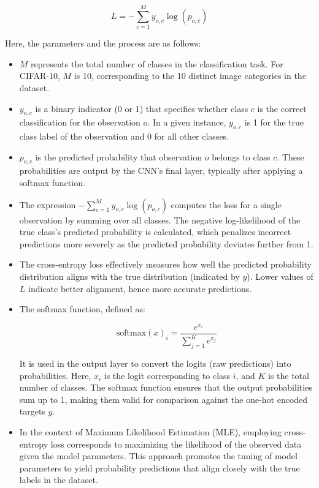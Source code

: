 \documentclass[conference]{IEEEtran}
\begin{document}
	\begin{equation}
		L = - \sum_{c=1}^{M} y_{o,c} \log(p_{o,c})
	\end{equation}
	
	Here, the parameters and the process are as follows:
	\begin{itemize}
		\item \(M\) represents the total number of classes in the classification task. For CIFAR-10, \(M\) is 10, corresponding to the 10 distinct image categories in the dataset.
		
		\item \(y_{o,c}\) is a binary indicator (0 or 1) that specifies whether class \(c\) is the correct classification for the observation \(o\). In a given instance, \(y_{o,c}\) is 1 for the true class label of the observation and 0 for all other classes.
		
		\item \(p_{o,c}\) is the predicted probability that observation \(o\) belongs to class \(c\). These probabilities are output by the CNN's final layer, typically after applying a softmax function.
		
		\item The expression \(- \sum_{c=1}^{M} y_{o,c} \log(p_{o,c})\) computes the loss for a single observation by summing over all classes. The negative log-likelihood of the true class's predicted probability is calculated, which penalizes incorrect predictions more severely as the predicted probability deviates further from 1.
		
		\item The cross-entropy loss effectively measures how well the predicted probability distribution aligns with the true distribution (indicated by \(y\)). Lower values of \(L\) indicate better alignment, hence more accurate predictions.
		
		\item The softmax function, defined as:
		
		\begin{equation}
			\text{softmax}(x)_i = \frac{e^{x_i}}{\sum_{j=1}^{K} e^{x_j}}
		\end{equation}
		
		It is used in the output layer to convert the logits (raw predictions) into probabilities. Here, \(x_i\) is the logit corresponding to class \(i\), and \(K\) is the total number of classes. The softmax function ensures that the output probabilities sum up to 1, making them valid for comparison against the one-hot encoded targets \(y\).
		
		\item In the context of Maximum Likelihood Estimation (MLE), employing cross-entropy loss corresponds to maximizing the likelihood of the observed data given the model parameters. This approach promotes the tuning of model parameters to yield probability predictions that align closely with the true labels in the dataset.
	\end{itemize}
	
\end{document}
